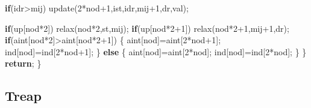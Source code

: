 \documentclass[10pt,]{article}
\newenvironment{Shaded}{}{}
\newcommand{\KeywordTok}[1]{\textcolor[rgb]{0.00,0.44,0.13}{\textbf{{#1}}}}
\newcommand{\DecValTok}[1]{\textcolor[rgb]{0.25,0.63,0.44}{{#1}}}
\newcommand{\NormalTok}[1]{{#1}}
\begin{document}
\begin{Shaded}
\begin{Highlighting}[]
    \KeywordTok{if}\NormalTok{(idr>mij)}
      \NormalTok{update(}\DecValTok{2}\NormalTok{*nod}\DecValTok{+1}\NormalTok{,ist,idr,mij}\DecValTok{+1}\NormalTok{,dr,val);}

    \KeywordTok{if}\NormalTok{(up[nod*}\DecValTok{2}\NormalTok{])}
      \NormalTok{relax(nod*}\DecValTok{2}\NormalTok{,st,mij);}
    \KeywordTok{if}\NormalTok{(up[nod*}\DecValTok{2+1}\NormalTok{])}
      \NormalTok{relax(nod*}\DecValTok{2+1}\NormalTok{,mij}\DecValTok{+1}\NormalTok{,dr);}
    \KeywordTok{if}\NormalTok{(aint[nod*}\DecValTok{2}\NormalTok{]>aint[nod*}\DecValTok{2+1}\NormalTok{])}
    \NormalTok{\{}
      \NormalTok{aint[nod]=aint[}\DecValTok{2}\NormalTok{*nod}\DecValTok{+1}\NormalTok{];}
      \NormalTok{ind[nod]=ind[}\DecValTok{2}\NormalTok{*nod}\DecValTok{+1}\NormalTok{];}
    \NormalTok{\}}
    \KeywordTok{else}
    \NormalTok{\{}
      \NormalTok{aint[nod]=aint[}\DecValTok{2}\NormalTok{*nod];}
      \NormalTok{ind[nod]=ind[}\DecValTok{2}\NormalTok{*nod];}
    \NormalTok{\}}
  \NormalTok{\}}
  \KeywordTok{return}\NormalTok{;}
\NormalTok{\}}
\end{Highlighting}
\end{Shaded}

\subsection{Treap}
\end{document}
